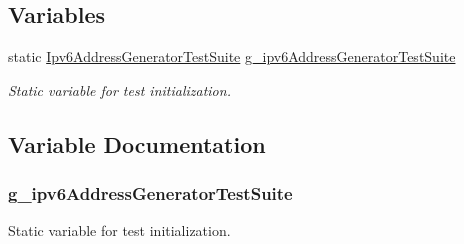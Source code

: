 \subsection*{Variables}
\begin{DoxyCompactItemize}
\item 
static \hyperlink{classIpv6AddressGeneratorTestSuite}{Ipv6\+Address\+Generator\+Test\+Suite} \hyperlink{ipv6-address-generator-test-suite_8cc_ab483b3aaf4dbe2b8f06707a1918e07ad}{g\+\_\+ipv6\+Address\+Generator\+Test\+Suite}
\begin{DoxyCompactList}\small\item\em Static variable for test initialization. \end{DoxyCompactList}\end{DoxyCompactItemize}


\subsection{Variable Documentation}
\subsubsection[{\texorpdfstring{g\+\_\+ipv6\+Address\+Generator\+Test\+Suite}{g_ipv6AddressGeneratorTestSuite}}]{ g\+\_\+ipv6\+Address\+Generator\+Test\+Suite\hspace{0.3cm}{\ttfamily [static]}}\hypertarget{ipv6-address-generator-test-suite_8cc_ab483b3aaf4dbe2b8f06707a1918e07ad}{}\label{ipv6-address-generator-test-suite_8cc_ab483b3aaf4dbe2b8f06707a1918e07ad}


Static variable for test initialization. 

